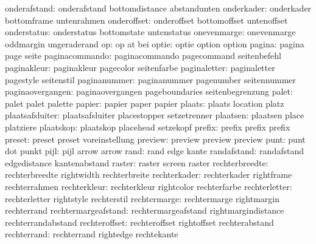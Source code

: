         onderafstand:  onderafstand         bottomdistance       abstandunten
          onderkader:  onderkader           bottomframe          untenrahmen
         onderoffset:  onderoffset          bottomoffset         untenoffset
         onderstatus:  onderstatus          bottomstate          untenstatus
         onevenmarge:  onevenmarge          oddmargin            ungeraderand
                  op:  op                   at                   bei
               optie:  optie                option               option
              pagina:  pagina               page                 seite
      paginacommando:  paginacommando       pagecommand          seitenbefehl
         paginakleur:  paginakleur          pagecolor            seitenfarbe
        paginaletter:  paginaletter         pagestyle            seitenstil
        paginanummer:  paginanummer         pagenumber           seitennummer
    paginaovergangen:  paginaovergangen     pageboundaries       seitenbegrenzung
               palet:  palet                palet                palette
              papier:  papier               paper                papier
              plaats:  plaats               location             platz
     plaatsafsluiter:  plaatsafsluiter      placestopper         setzetrenner
            plaatsen:  plaatsen             place                platziere
           plaatskop:  plaatskop            placehead            setzekopf
              prefix:  prefix               prefix               prefix
              preset:  preset               preset               voreinstellung
             preview:  preview              preview              preview
                punt:  punt                 dot                  punkt
                pijl:  pijl                 arrow                arrow %
                rand:  rand                 edge                 kante
         randafstand:  randafstand          edgedistance         kantenabstand
              raster:  raster               screen               raster
      rechterbreedte:  rechterbreedte       rightwidth           rechterbreite
        rechterkader:  rechterkader         rightframe           rechterrahmen
        rechterkleur:  rechterkleur         rightcolor           rechterfarbe
       rechterletter:  rechterletter        rightstyle           rechterstil
        rechtermarge:  rechtermarge         rightmargin          rechterrand
 rechtermargeafstand:  rechtermargeafstand  rightmargindistance  rechterrandabstand
       rechteroffset:  rechteroffset        rightoffset          rechterabstand
         rechterrand:  rechterrand          rightedge            rechtekante
